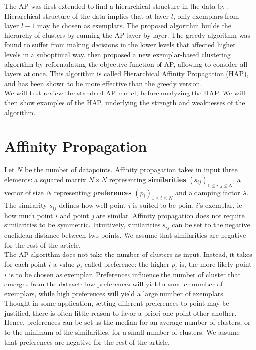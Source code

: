 \documentclass{ipol}
\begin{document}
The AP was first extended to find a hierarchical structure in the data by
\cite{Xiao07jointaffinity}. Hierarchical structure of the data implies that at
layer $l$, only exemplars from layer $l - 1$ may be chosen as exemplars. The
proposed algorithm builds the hierarchy of clusters by running the AP layer by
layer. The greedy algorithm was found to suffer from making decisions in the
lower levels that affected higher levels in a suboptimal way. \cite{hap} then
proposed a new exemplar-based clustering algorithm by reformulating the
objective function of AP, allowing to consider all layers at once. This
algorithm is called Hierarchical Affinity Propagation (HAP), and has been
shown to be more effective than the greedy version. \\

We will first review the standard AP model, before analyzing the HAP. We will
then show examples of the HAP, underlying the strength and weaknesses of the
algorithm.

\section{Affinity Propagation}

Let $N$ be the number of datapoints. Affinity propagation takes in input three
elements: a squared matrix $N \times N$ representing \textbf{similarities}
$(s_{ij})_{1 \leq i, j \leq N}$, a vector of size $N$ representing
\textbf{preferences} $(p_i)_{1 \leq i \leq N}$ and a damping factor $\lambda$.
\\

The similarity $s_{ij}$ defines how well point $j$ is suited to be point $i$'s
exemplar, ie how much point $i$ and point $j$ are similar. Affinity
propagation does not require similarities to be symmetric. Intuitively,
similarities $s_{ij}$ can be set to the negative euclidean distance between
two points. We assume that similarities are negative for the rest of the
article.\\

The AP algorithm does not take the number of clusters as input. Instead, it
takes for each point $i$ a value $p_i$ called preference: the higher $p_i$ is,
the more likely point $i$ is to be chosen as exemplar. Preferences influence
the number of cluster that emerges from the dataset: low preferences will
yield a smaller number of exemplars, while high preferences will yield a large
number of exemplars. Thought in some application, setting different
preferences to point may be justified, there is often little reason to favor a
priori one point other another. Hence, preferences can be set as the median
for an average number of clusters, or to the minimum of the similarities, for
a small number of clusters. We assume that preferences are negative for the
rest of the article.\\
\end{document}
